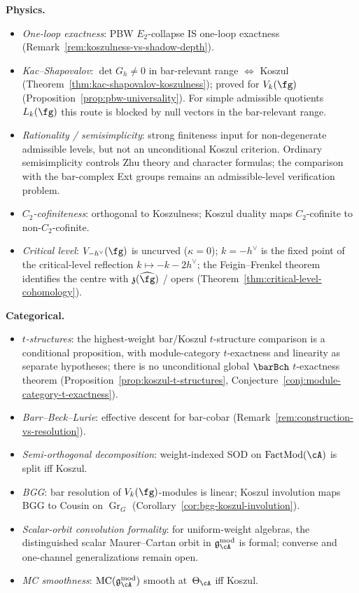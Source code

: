 \smallskip\noindent\textbf{Physics.}
\begin{itemize}[nosep]
\item \emph{One-loop exactness}: PBW $E_2$-collapse IS one-loop exactness (Remark~\ref{rem:koszulness-vs-shadow-depth}).
\item \emph{Kac--Shapovalov}: $\det G_h \neq 0$ in bar-relevant range $\Leftrightarrow$ Koszul (Theorem~\ref{thm:kac-shapovalov-koszulness}); proved for $V_k(\fg)$ (Proposition~\ref{prop:pbw-universality}). For simple admissible quotients $L_k(\fg)$ this route is blocked by null vectors in the bar-relevant range.
\item \emph{Rationality / semisimplicity}: strong finiteness input for non-degenerate admissible levels, but not an unconditional Koszul criterion. Ordinary semisimplicity controls Zhu theory and character formulas; the comparison with the bar-complex Ext groups remains an admissible-level verification problem.
\item \emph{$C_2$-cofiniteness}: orthogonal to Koszulness; Koszul duality maps $C_2$-cofinite to non-$C_2$-cofinite.
\item \emph{Critical level}: $V_{-h^\vee}(\fg)$ is uncurved
(\(\kappa=0\)); \(k=-h^\vee\) is the fixed point of the
critical-level reflection \(k\mapsto -k-2h^\vee\); the
Feigin--Frenkel theorem identifies the centre with
\(\mathfrak{z}(\widehat{\fg})\) / opers
(Theorem~\ref{thm:critical-level-cohomology}).
\end{itemize}

\smallskip\noindent\textbf{Categorical.}
\begin{itemize}[nosep]
\item \emph{$t$-structures}: the highest-weight bar/Koszul $t$-structure comparison is a conditional proposition, with module-category $t$-exactness and linearity as separate hypotheses; there is no unconditional global $\barBch$ $t$-exactness theorem (Proposition~\ref{prop:koszul-t-structures}, Conjecture~\ref{conj:module-category-t-exactness}).
\item \emph{Barr--Beck--Lurie}: effective descent for bar-cobar (Remark~\ref{rem:construction-vs-resolution}).
\item \emph{Semi-orthogonal decomposition}: weight-indexed SOD on $\operatorname{FactMod}(\cA)$ is split iff Koszul.
\item \emph{BGG}: bar resolution of $V_k(\fg)$-modules is linear; Koszul involution maps BGG to Cousin on $\operatorname{Gr}_G$ (Corollary~\ref{cor:bgg-koszul-involution}).
\item \emph{Scalar-orbit convolution formality}: for uniform-weight algebras, the distinguished scalar Maurer--Cartan orbit in $\mathfrak{g}_\cA^{\mathrm{mod}}$ is formal; converse and one-channel generalizations remain open.
\item \emph{MC smoothness}: $\operatorname{MC}(\mathfrak{g}_\cA^{\mathrm{mod}})$ smooth at~$\Theta_\cA$ iff Koszul.
\end{itemize}


